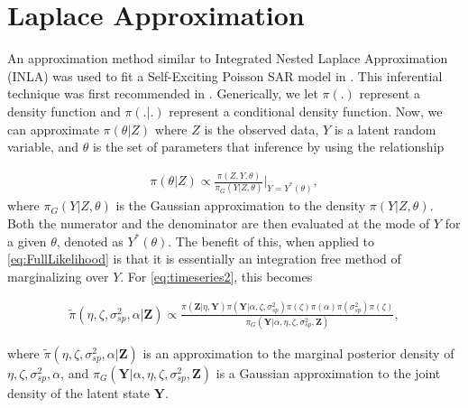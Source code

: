 \documentclass[11pt]{isuthesis}
\begin{document}
	
	
	\section{Laplace Approximation}
	
	An approximation method similar to Integrated Nested Laplace Approximation (INLA) was used to fit a Self-Exciting Poisson SAR model in \cite{2017arXiv170308429C}.  This inferential technique was first recommended in \cite{tierney1986accurate}.  Generically, we let $\pi(.)$ represent a density function and $\pi(.|.)$ represent a conditional density function.  Now, we can approximate $\pi(\theta|Z)$ where $Z$ is the observed data, $Y$ is a latent random variable, and $\theta$ is the set of parameters that inference by using the relationship
	
	\begin{align}
	\pi(\theta|Z)\propto \frac{ \pi(Z,Y,\theta)}{\pi_G(Y|Z,\theta)}\bigg\rvert_{Y=Y^*(\theta)},
	\end{align}
	where $\pi_G(Y|Z,\theta)$ is the Gaussian approximation to the density $\pi(Y|Z,\theta)$.  Both the numerator and the denominator are then evaluated at the mode of $Y$ for a given $\theta$, denoted as $Y^*(\theta)$.  The benefit of this, when applied to \eqref{eq:FullLikelihood} is that it is essentially an integration free method of marginalizing over $Y$.  For \eqref{eq:timeseries2}, this becomes
	
	\begin{align}
	\tilde{\pi}(\eta,\zeta,\sigma_{sp}^2,\alpha|\boldsymbol{Z})\propto \frac{\pi(\boldsymbol{Z}|\eta,\boldsymbol{Y})\pi(\boldsymbol{Y}|\alpha,\zeta,\sigma_{sp}^2)\pi(\zeta)\pi(\alpha)\pi(\sigma_{sp}^2)\pi(\zeta)}{\pi_G(\boldsymbol{Y}|\alpha,\eta,\zeta,\sigma_{sp}^2,\boldsymbol{Z})} \label{eq:INLA},
	\end{align}
	
	
	
	
	where $\tilde{\pi}(\eta,\zeta,\sigma_{sp}^2,\alpha|\boldsymbol{Z})$ is an approximation to the marginal posterior density of $\eta,\zeta,\sigma_{sp}^2,\alpha$, and $\pi_G(\boldsymbol{Y}|\alpha,\eta,\zeta,\sigma_{sp}^2,\boldsymbol{Z})$ is a Gaussian approximation to the joint density of the latent state $\boldsymbol{Y}$. 
	
\end{document}
